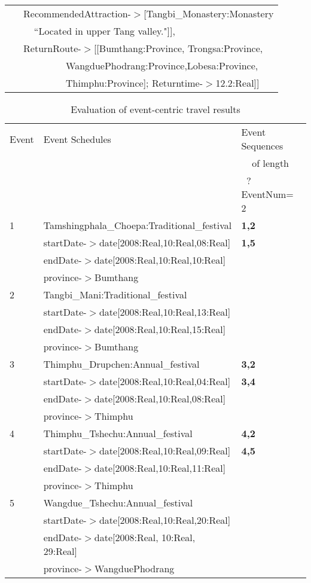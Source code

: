 \begin{table} [tbph]
\begin{tabular}{|l|l|}
		   &$~~${\color{blue}RecommendedAttraction}-$>$[Tangbi\_Monastery:Monastery \\
		   &$~~~~~~~$``Located in upper Tang valley."]],\\	   
       &$~~${\color{blue}ReturnRoute}-$>$[[Bumthang:Province, Trongsa:Province,  \\   
	   &$~~~~~~~~~~~~~~~~~~~~~~$WangduePhodrang:Province,Lobesa:Province, \\
	   &$~~~~~~~~~~~~~~~~~~~~~~$Thimphu:Province]; Returntime-$>$12.2:Real]]\\
\hline		   
\end{tabular} 
\end{table} 

\begin{table} [tbph]
\caption{Evaluation of event-centric travel results}
\centering
\footnotesize
\begin{tabular}{|l|l|l|}
\hline
Event &Event Schedules &Event Sequences\\
 & & $~~~~~$of length\\
 & &$~$ ?EventNum= 2\\
 \hline
  1  &Tamshingphala\_Choepa:Traditional\_festival&\textbf{1,2}\\
     &startDate-$>$date[2008:Real,10:Real,08:Real]&\textbf{1,5}\\
   &endDate-$>$date[2008:Real,10:Real,10:Real]&\\
   &province-$>$Bumthang&\\
\hline
  2  &Tangbi\_Mani:Traditional\_festival&\\
     &startDate-$>$date[2008:Real,10:Real,13:Real]&\\
   &endDate-$>$date[2008:Real,10:Real,15:Real]&\\
   &province-$>$Bumthang&\\
\hline
  3  &Thimphu\_Drupchen:Annual\_festival&\textbf{3,2}\\
     &startDate-$>$date[2008:Real,10:Real,04:Real]&\textbf{3,4}\\
   &endDate-$>$date[2008:Real,10:Real,08:Real]&\\
   &province-$>$Thimphu&\\
\hline
 4  &Thimphu\_Tshechu:Annual\_festival&\textbf{4,2}\\
     &startDate-$>$date[2008:Real,10:Real,09:Real]&\textbf{4,5}\\
   &endDate-$>$date[2008:Real,10:Real,11:Real]&\\
   &province-$>$Thimphu&\\
\hline
 5  &Wangdue\_Tshechu:Annual\_festival&\\
     &startDate-$>$date[2008:Real,10:Real,20:Real]&\\
   &endDate-$>$date[2008:Real, 10:Real, 29:Real]&\\
   &province-$>$WangduePhodrang&\\
\hline
\end{tabular} 
\end{table}  

